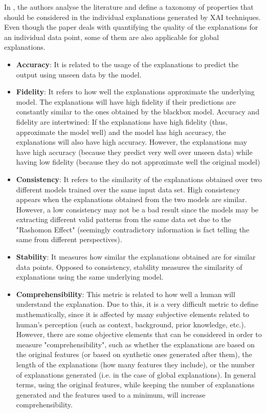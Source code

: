 In \parencite{carvalho2019machine}, the authors analyse the literature and define a taxonomy of properties that should be considered in the individual explanations generated by XAI techniques. Even though the paper deals with quantifying the quality of the explanations for an individual data point, some of them are also applicable for global explanations.
\begin{itemize}
    \item \textbf{Accuracy}: It is related to the usage of the explanations to predict the output using unseen data by the model. 
    \item \textbf{Fidelity}: It refers to how well the explanations approximate the underlying model. The explanations will have high fidelity if their predictions are constantly similar to the ones obtained by the blackbox model. Accuracy and fidelity are intertwined: If the explanations have high fidelity (thus, approximate the model well) and the model has high accuracy, the explanations will also have high accuracy. However, the explanations may have high accuracy (because they predict very well over unseen data) while having low fidelity (because they do not approximate well the original model)
    \item \textbf{Consistency}: It refers to the similarity of the explanations obtained over two different models trained over the same input data set. High consistency appears when the explanations obtained from the two models are similar. However, a low consistency may not be a bad result since the models may be extracting different valid patterns from the same data set due to the "Rashomon Effect" (seemingly contradictory information is fact telling the same from different perspectives).
    \item \textbf{Stability}: It measures how similar the explanations obtained are for similar data points. Opposed to consistency, stability measures the similarity of explanations using the same underlying model.
    \item \textbf{Comprehensibility}: This metric is related to how well a human will understand the explanation. Due to this, it is a very difficult metric to define mathematically, since it is affected by many subjective elements related to human's perception (such as context, background, prior knowledge, etc.). However, there are some objective elements that can be considered in order to measure "comprehensibility", such as whether the explanations are based on the original features (or based on synthetic ones generated after them), the length of the explanations (how many features they include), or the number of explanations generated (i.e. in the case of global explanations). In general terms, using the original features, while keeping the number of explanations generated and the features used to a minimum, will increase comprehensibility.

\end{itemize}
